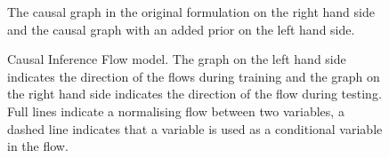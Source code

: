 \documentclass{report}
\newcommand{\bZ}{\mathbf{Z}}
\begin{document}
\begin{figure}
    \centering
    
    \hspace{2cm}
    
    \caption{The causal graph in the original formulation on the right hand side and the causal graph with an added prior on the left hand side.}
    \label{fig:graph_prior_at_outcome}
\end{figure}

\begin{figure}[h]
    \centering
    
    \qquad
    
    \caption{Causal Inference Flow model. The graph on the left hand side indicates the direction of the flows during training and the graph on the right hand side indicates the direction of the flow during testing. Full lines indicate a normalising flow between two variables, a dashed line indicates that a variable is used as a conditional variable in the flow.}
    \label{fig:causal_flow_with_y_prior}
\end{figure}







\end{document}
